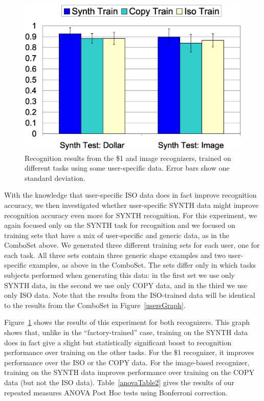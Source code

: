 \documentclass[final,5p,twocolumn]{elsarticle}
\begin{document}
\begin{figure}
\includegraphics[width=1.0\hsize]{dollar_image_combo.eps}
\caption{Recognition results from the \$1 and image recognizers, trained on different tasks using some user-specific data.  Error bars show one standard deviation.}
\label{comboGraph}
\end{figure}

With the knowledge that user-specific ISO data does in fact improve
recognition accuracy, we then investigated whether user-specific SYNTH
data might improve recognition accuracy even more for SYNTH
recognition.  For this experiment, we again focused only on the SYNTH
task for recognition and we focused on training sets that have a mix of
user-specific and generic data, as in the ComboSet above.  We
generated three different training sets for each user, one for each
task.  All three sets contain three generic shape examples and two
user-specific examples, as above in the ComboSet.  The sets differ
only in which tasks subjects performed when generating this data: in
the first set we use only SYNTH data, in the second we use only COPY
data, and in the third we use only ISO data.  Note that the results
from the ISO-trained data will be identical to the results from the
ComboSet in Figure~\ref{usersGraph}.

Figure~\ref{comboGraph} shows the results of this experiment for both
recognizers.  This graph shows that, unlike in the ``factory-trained'' case,
 training on the SYNTH data does in
fact give a slight but statistically significant boost to recognition performance over training on
the other tasks. For the \$1 recognizer, it improves
performance over the ISO or the COPY data.  For the image-based
recognizer, training on the SYNTH data improves
performance over training on the COPY data (but not the ISO data).
Table~\ref{anovaTable2} gives the results of our repeated measures
ANOVA Post Hoc tests using Bonferroni correction.
\end{document}
